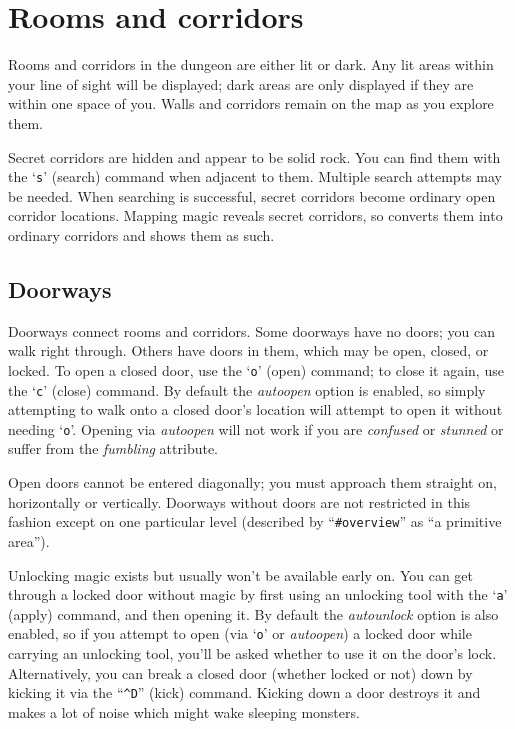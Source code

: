 
\section{Rooms and corridors}

Rooms and corridors in the dungeon are either lit or dark.
Any lit areas within your line of sight will be displayed;
dark areas are only displayed if they are within one space of you.
Walls and corridors remain on the map as you explore them.

Secret corridors are hidden and appear to be solid rock.
You can find them with the `{\tt s}' (search) command when adjacent
to them.
Multiple search attempts may be needed.
When searching is successful, secret corridors become ordinary open
corridor locations.
Mapping magic reveals secret corridors, so converts them into ordinary
corridors and shows them as such.

\subsection*{Doorways}

Doorways connect rooms and corridors.
Some doorways have no doors; you can walk right through.
Others have doors in them, which may be open, closed, or locked.
To open a closed door, use the `{\tt o}' (open)
command; to close it again, use the `{\tt c}' (close) command.
By default the
{\it autoopen}
option is enabled, so simply attempting to walk onto a closed door's
location will attempt to open it without needing `{\tt o}'.
Opening via
{\it autoopen}
will not work if you are {\it confused\/} or {\it stunned\/} or suffer from
the {\it fumbling\/} attribute.

Open doors cannot be entered diagonally; you must approach them
straight on, horizontally or vertically.
Doorways without doors are
not restricted in this fashion except on one particular level
(described by ``{\tt \#overview}'' as ``a primitive area'').

Unlocking magic exists but usually won't be available early on.
You can get through a locked door without magic by first using an
unlocking tool with the `{\tt a}' (apply) command, and then opening it.
By default the
{\it autounlock}
option is also enabled, so if you attempt to open (via `{\tt o}' or
{\it autoopen})
a locked door while carrying an unlocking tool, you'll be asked whether
to use it on the door's lock.
Alternatively, you can break a closed door (whether locked or not) down
by kicking it via the ``{\tt \^{}D}'' (kick) command.
Kicking down a door destroys it and makes a lot of noise which might
wake sleeping monsters.

